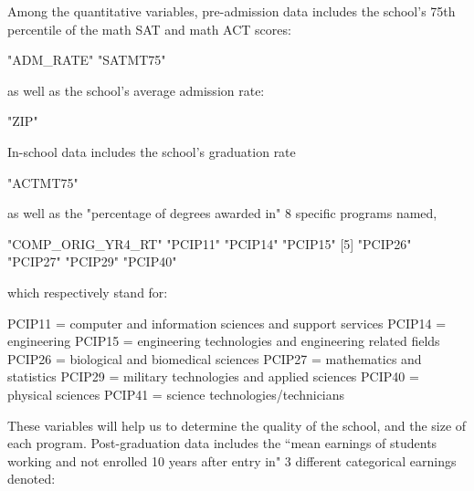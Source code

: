 \documentclass{article}
\begin{document}
Among the quantitative variables, pre-admission data includes the school's 75th percentile of the math SAT and math ACT scores:
\begin{Schunk}
\begin{Soutput}
[1] "ADM_RATE" "SATMT75" 
\end{Soutput}
\end{Schunk}
as well as the school's average admission rate: 
\begin{Schunk}
\begin{Soutput}
[1] "ZIP"
\end{Soutput}
\end{Schunk}
In-school data includes the school's graduation rate 
\begin{Schunk}
\begin{Soutput}
[1] "ACTMT75"
\end{Soutput}
\end{Schunk}
as well as the "percentage of degrees awarded in" 8 specific programs named, 
\begin{Schunk}
\begin{Soutput}
[1] "COMP_ORIG_YR4_RT" "PCIP11"           "PCIP14"           "PCIP15"          
[5] "PCIP26"           "PCIP27"           "PCIP29"           "PCIP40"          
\end{Soutput}
\end{Schunk}
which respectively stand for:
\begin{center}
\begin{flushleft}
PCIP11 = computer and information sciences and support services \newline
PCIP14 = engineering \newline
PCIP15 = engineering technologies and engineering related fields \newline
PCIP26 = biological and biomedical sciences \newline
PCIP27 = mathematics and statistics \newline
PCIP29 = military technologies and applied sciences \newline
PCIP40 = physical sciences \newline
PCIP41 = science technologies/technicians \newline
\end{flushleft}
\end{center}
These variables will help us to determine the quality of the school, and the size of each program.  Post-graduation data includes the ``mean earnings of students working and not enrolled 10 years after entry in" 3 different categorical earnings denoted:  
\end{document}
